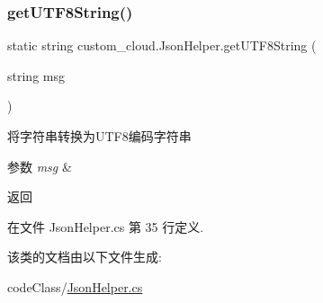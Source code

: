 \mbox{\label{classcustom__cloud_1_1_json_helper_a5fbe80a07a71ee67e1fb79194661c50d}} 
\subsubsection{\texorpdfstring{get\+U\+T\+F8\+String()}{getUTF8String()}}
{\footnotesize\ttfamily static string custom\+\_\+cloud.\+Json\+Helper.\+get\+U\+T\+F8\+String (\begin{DoxyParamCaption}\item[{string}]{msg }\end{DoxyParamCaption})\hspace{0.3cm}{\ttfamily [static]}}



将字符串转换为\+U\+T\+F8编码字符串 


\begin{DoxyParams}{参数}
{\em msg} & \\
\hline
\end{DoxyParams}
\begin{DoxyReturn}{返回}

\end{DoxyReturn}


在文件 Json\+Helper.\+cs 第 35 行定义.



该类的文档由以下文件生成\+:\begin{DoxyCompactItemize}
\item 
code\+Class/\hyperlink{_json_helper_8cs}{Json\+Helper.\+cs}\end{DoxyCompactItemize}
